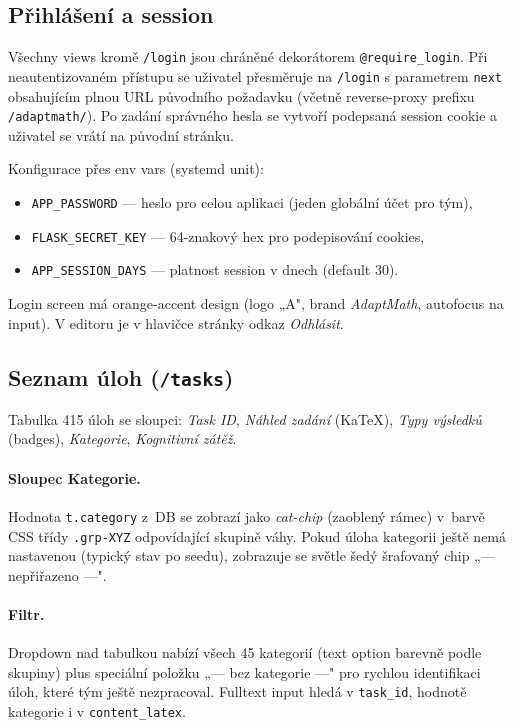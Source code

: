 \documentclass[11pt,a4paper]{article}
\begin{document}
\subsection{Přihlášení a session}

Všechny views kromě \texttt{/login} jsou chráněné dekorátorem \texttt{@require\_login}. Při neautentizovaném přístupu se uživatel přesměruje na \texttt{/login} s parametrem \texttt{next} obsahujícím plnou URL původního požadavku (včetně reverse-proxy prefixu \texttt{/adaptmath/}). Po zadání správného hesla se vytvoří podepsaná session cookie a uživatel se vrátí na původní stránku.

Konfigurace přes env vars (systemd unit):
\begin{itemize}
  \item \texttt{APP\_PASSWORD} --- heslo pro celou aplikaci (jeden globální účet pro tým),
  \item \texttt{FLASK\_SECRET\_KEY} --- 64-znakový hex pro podepisování cookies,
  \item \texttt{APP\_SESSION\_DAYS} --- platnost session v dnech (default 30).
\end{itemize}

Login screen má orange-accent design (logo „A", brand \emph{AdaptMath}, autofocus na input). V editoru je v hlavičce stránky odkaz \emph{Odhlásit}.

\subsection{Seznam úloh (\texttt{/tasks})}

Tabulka 415 úloh se sloupci: \emph{Task ID}, \emph{Náhled zadání} (KaTeX), \emph{Typy výsledků} (badges), \emph{Kategorie}, \emph{Kognitivní zátěž}.

\paragraph{Sloupec Kategorie.} Hodnota \texttt{t.category} z~DB se zobrazí jako \emph{cat-chip} (zaoblený rámec) v~barvě CSS třídy \texttt{.grp-XYZ} odpovídající skupině váhy. Pokud úloha kategorii ještě nemá nastavenou (typický stav po seedu), zobrazuje se světle šedý šrafovaný chip „--- nepřiřazeno ---".

\paragraph{Filtr.} Dropdown nad tabulkou nabízí všech 45 kategorií (text option barevně podle skupiny) plus speciální položku „--- bez kategorie ---" pro rychlou identifikaci úloh, které tým ještě nezpracoval. Fulltext input hledá v \texttt{task\_id}, hodnotě kategorie i v \texttt{content\_latex}.
\end{document}
